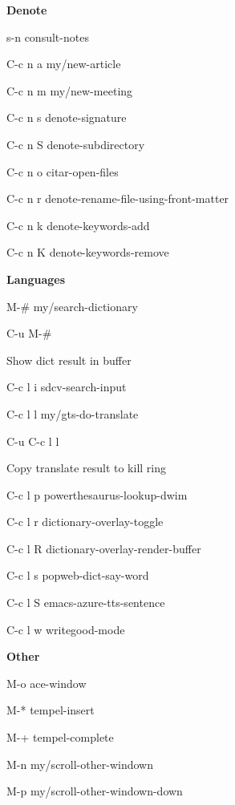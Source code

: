 \documentclass[10pt]{article}
\renewcommand\subsection[1]{\smallskip\par\textbf{\color{heading}#1}}
\newcommand\humanreadable[1]{{\par\color{default}\small\sffamily#1}}
\begin{document}
\begin{multicols}{4}
  \subsection{Denote}
  \begin{keylist}
  \item[s-n] consult-notes
  \item[C-c n a] my/new-article
  \item[C-c n m] my/new-meeting
  \item[C-c n s] denote-signature
  \item[C-c n S] denote-subdirectory
  \item[C-c n o] citar-open-files
  \item[C-c n r] denote-rename-file-using-front-matter
  \item[C-c n k] denote-keywords-add
  \item[C-c n K] denote-keywords-remove
  \end{keylist}

  \subsection{Languages}
  \begin{keylist}
  \item[M-\#] my/search-dictionary
  \item[C-u M-\#] \humanreadable{Show dict result in buffer}
  \item[C-c l i] sdcv-search-input
  \item[C-c l l] my/gts-do-translate
  \item[C-u C-c l l] \humanreadable{Copy translate result to kill ring}
  \item[C-c l p] powerthesaurus-lookup-dwim
  \item[C-c l r] dictionary-overlay-toggle
  \item[C-c l R] dictionary-overlay-render-buffer
  \item[C-c l s] popweb-dict-say-word
  \item[C-c l S] emacs-azure-tts-sentence
  \item[C-c l w] writegood-mode
  \end{keylist}

  \subsection{Other}
  \begin{keylist}
  \item[M-o] ace-window
  \item[M-*] tempel-insert
  \item[M-+] tempel-complete
  \item[M-n] my/scroll-other-windown
  \item[M-p] my/scroll-other-windown-down


\end{keylist}
\end{multicols}
\end{document}
